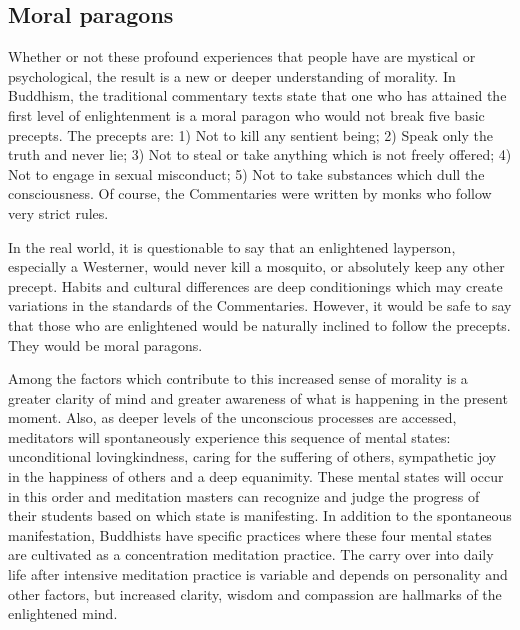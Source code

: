 \documentclass[a5paper,10pt,english]{book}
\begin{document}
\subsection{Moral paragons}
\label{\detokenize{saints:moral-paragons}}
\sphinxAtStartPar
Whether or not these profound experiences that people have are mystical
or psychological, the result is a new or deeper understanding of
morality. In Buddhism, the traditional commentary texts state that one
who has attained the first level of enlightenment is a moral paragon who
would not break five basic precepts. The precepts are: 1) Not to kill
any sentient being; 2) Speak only the truth and never lie; 3) Not to
steal or take anything which is not freely offered; 4) Not to engage in
sexual misconduct; 5) Not to take substances which dull the
consciousness. Of course, the Commentaries were written by monks who
follow very strict rules.

\sphinxAtStartPar
In the real world, it is questionable to say that an enlightened
layperson, especially a Westerner, would never kill a mosquito, or
absolutely keep any other precept. Habits and cultural differences are
deep conditionings which may create variations in the standards of the
Commentaries. However, it would be safe to say that those who are
enlightened would be naturally inclined to follow the precepts. They
would be moral paragons.

\sphinxAtStartPar
Among the factors which contribute to this increased sense of morality
is a greater clarity of mind and greater awareness of what is happening
in the present moment. Also, as deeper levels of the unconscious
processes are accessed, meditators will spontaneously experience this
sequence of mental states: unconditional loving\sphinxhyphen{}kindness, caring for the
suffering of others, sympathetic joy in the happiness of others and a
deep equanimity. These mental states will occur in this order and
meditation masters can recognize and judge the progress of their
students based on which state is manifesting. In addition to the
spontaneous manifestation, Buddhists have specific practices where these
four mental states are cultivated as a concentration meditation
practice. The carry over into daily life after intensive meditation
practice is variable and depends on personality and other factors, but
increased clarity, wisdom and compassion are hallmarks of the
enlightened mind.
\end{document}
